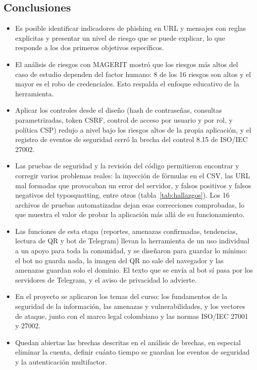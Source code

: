 \documentclass[journal,onecolumn,12pt,draftclsnofoot]{IEEEtran}
\begin{document}
\subsection{Conclusiones}

\begin{itemize}
  \item Es posible identificar indicadores de phishing en URL y mensajes con reglas explícitas y presentar un nivel de riesgo que se puede explicar, lo que responde a los dos primeros objetivos específicos.
  \item El análisis de riesgos con MAGERIT mostró que los riesgos más altos del caso de estudio dependen del factor humano: 8 de los 16 riesgos son altos y el mayor es el robo de credenciales. Esto respalda el enfoque educativo de la herramienta.
  \item Aplicar los controles desde el diseño (hash de contraseñas, consultas parametrizadas, token CSRF, control de acceso por usuario y por rol, y política CSP) redujo a nivel bajo los riesgos altos de la propia aplicación, y el registro de eventos de seguridad cerró la brecha del control 8.15 de ISO/IEC 27002.
  \item Las pruebas de seguridad y la revisión del código permitieron encontrar y corregir varios problemas reales: la inyección de fórmulas en el CSV, las URL mal formadas que provocaban un error del servidor, y falsos positivos y falsos negativos del typosquatting, entre otros (tabla~\ref{tab:hallazgos}). Los 16 archivos de pruebas automatizadas dejan esas correcciones comprobadas, lo que muestra el valor de probar la aplicación más allá de su funcionamiento.
  \item Las funciones de esta etapa (reportes, amenazas confirmadas, tendencias, lectura de QR y bot de Telegram) llevan la herramienta de un uso individual a un apoyo para toda la comunidad, y se diseñaron para guardar lo mínimo: el bot no guarda nada, la imagen del QR no sale del navegador y las amenazas guardan solo el dominio. El texto que se envía al bot sí pasa por los servidores de Telegram, y el aviso de privacidad lo advierte.
  \item En el proyecto se aplicaron los temas del curso: los fundamentos de la seguridad de la información, las amenazas y vulnerabilidades, y los vectores de ataque, junto con el marco legal colombiano y las normas ISO/IEC 27001 y 27002.
  \item Quedan abiertas las brechas descritas en el análisis de brechas, en especial eliminar la cuenta, definir cuánto tiempo se guardan los eventos de seguridad y la autenticación multifactor.
\end{itemize}
\end{document}
